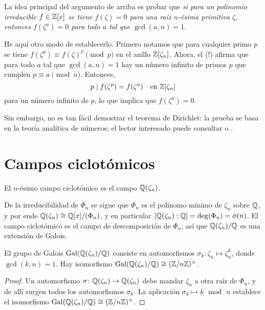 \begin{comentario}
  La idea principal del argumento de arriba es probar que \emph{si para un
    polinomio irreducible $f \in \mathbb{Z} [x]$ se tiene $f (\zeta) = 0$ para una raíz
    $n$-ésima primitiva $\zeta$, entonces $f (\zeta^a) = 0$ para todo $a$ tal
    que $\gcd (a,n) = 1$}.

  He aquí otro modo de establecerlo. Primero notamos que para cualquier primo
  $p$ se tiene $f (\zeta^p) \equiv f (\zeta)^p \pmod{p}$ en el anillo $\mathbb{Z}
  [\zeta_n]$. Ahora, el  (!) afirma que para todo $a$ tal que $\gcd (a,n) = 1$ hay un
  número infinito de primos $p$ que cumplen $p \equiv a \pmod{n}$. Entonces,
  $$p \mid f (\zeta^p) = f (\zeta^a) \quad \text{en }\mathbb{Z} [\zeta_n]$$
  para un número infinito de $p$, lo que implica que $f (\zeta^a) = 0$.

  Sin embargo, no es tan fácil demostrar el teorema de Dirichlet: la prueba se
  basa en la teoría analítica de números; el lector interesado puede consultar
  \cite[Chapter~16]{Ireland-Rosen} o \cite[Chapter~7]{Apostol-analytic}.
\end{comentario}


\section{Campos ciclotómicos}
\label{sec:campos-ciclotomicos}

\begin{definicion}
  El $n$-ésimo campo ciclotómico es el campo $\mathbb{Q} (\zeta_n)$.
\end{definicion}

De la irreducibilidad de $\Phi_n$ se sigue que $\Phi_n$ es el polinomo mínimo de
$\zeta_n$ sobre $\mathbb{Q}$, y por ende $\mathbb{Q} (\zeta_n) \cong \mathbb{Q} [x] / (\Phi_n)$, y en
particular $[\mathbb{Q} (\zeta_n) : \mathbb{Q}] = \deg (\Phi_n) = \phi (n)$. El campo
ciclotómico es el campo de descomposición de $\Phi_n$, así que
$\mathbb{Q} (\zeta_n)/\mathbb{Q}$ es una extensión de Galois.

\begin{proposicion}
  El grupo de Galois $\operatorname{Gal} (\mathbb{Q}(\zeta_n)/\mathbb{Q})$ consiste en automorfismos
  $\sigma_k\colon \zeta_n \mapsto \zeta_n^k$, donde $\gcd (k,n) = 1$.
  Hay isomorfismo $\operatorname{Gal} (\mathbb{Q} (\zeta_n)/\mathbb{Q}) \cong (\mathbb{Z}/n\mathbb{Z})^\times$.

  \begin{proof}
    Un automorfismo $\sigma\colon \mathbb{Q}(\zeta_n) \to \mathbb{Q}(\zeta_n)$ debe mandar
    $\zeta_n$ a otra raíz de $\Phi_n$, y de allí surgen todos los automorfismos
    $\sigma_k$. La aplicación $\sigma_k \mapsto k\operatorname{~mod~}n$
    establece el isomorfismo $\operatorname{Gal} (\mathbb{Q} (\zeta_n)/\mathbb{Q}) \cong (\mathbb{Z}/n\mathbb{Z})^\times$.
  \end{proof}
\end{proposicion}

